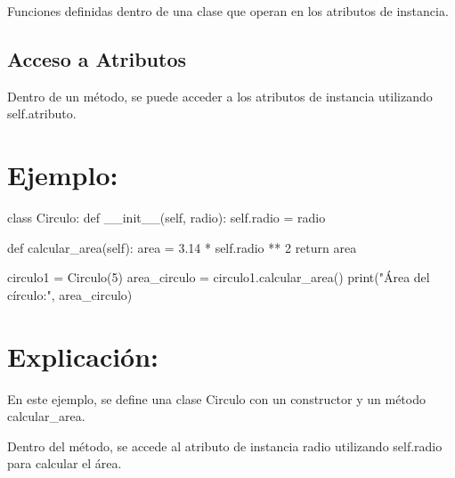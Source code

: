\documentclass[
  a4paper,
  DIV=11,
  numbers=noendperiod,
  onepage,
  openany]{scrreprt}
\newenvironment{Shaded}{\begin{snugshade}}{\end{snugshade}}
\newcommand{\BuiltInTok}[1]{\textcolor[rgb]{0.00,0.23,0.31}{#1}}
\newcommand{\ControlFlowTok}[1]{\textcolor[rgb]{0.00,0.23,0.31}{#1}}
\newcommand{\DecValTok}[1]{\textcolor[rgb]{0.68,0.00,0.00}{#1}}
\newcommand{\FloatTok}[1]{\textcolor[rgb]{0.68,0.00,0.00}{#1}}
\newcommand{\FunctionTok}[1]{\textcolor[rgb]{0.28,0.35,0.67}{#1}}
\newcommand{\KeywordTok}[1]{\textcolor[rgb]{0.00,0.23,0.31}{#1}}
\newcommand{\NormalTok}[1]{\textcolor[rgb]{0.00,0.23,0.31}{#1}}
\newcommand{\OperatorTok}[1]{\textcolor[rgb]{0.37,0.37,0.37}{#1}}
\newcommand{\StringTok}[1]{\textcolor[rgb]{0.13,0.47,0.30}{#1}}
\newcommand{\VariableTok}[1]{\textcolor[rgb]{0.07,0.07,0.07}{#1}}
\begin{document}
Funciones definidas dentro de una clase que operan en los atributos de
instancia.

\hypertarget{acceso-a-atributos}{%
\subsection{Acceso a Atributos}\label{acceso-a-atributos}}

Dentro de un método, se puede acceder a los atributos de instancia
utilizando self.atributo.

\hypertarget{ejemplo-52}{%
\section{Ejemplo:}\label{ejemplo-52}}

\begin{Shaded}
\begin{Highlighting}[]
\KeywordTok{class}\NormalTok{ Circulo:}
    \KeywordTok{def} \FunctionTok{\_\_init\_\_}\NormalTok{(}\VariableTok{self}\NormalTok{, radio):}
        \VariableTok{self}\NormalTok{.radio }\OperatorTok{=}\NormalTok{ radio}

    \KeywordTok{def}\NormalTok{ calcular\_area(}\VariableTok{self}\NormalTok{):}
\NormalTok{        area }\OperatorTok{=} \FloatTok{3.14} \OperatorTok{*} \VariableTok{self}\NormalTok{.radio }\OperatorTok{**} \DecValTok{2}
        \ControlFlowTok{return}\NormalTok{ area}

\NormalTok{circulo1 }\OperatorTok{=}\NormalTok{ Circulo(}\DecValTok{5}\NormalTok{)}
\NormalTok{area\_circulo }\OperatorTok{=}\NormalTok{ circulo1.calcular\_area()}
\BuiltInTok{print}\NormalTok{(}\StringTok{"Área del círculo:"}\NormalTok{, area\_circulo)}
\end{Highlighting}
\end{Shaded}

\hypertarget{explicaciuxf3n-52}{%
\section{Explicación:}\label{explicaciuxf3n-52}}

En este ejemplo, se define una clase Circulo con un constructor y un
método calcular\_area.

Dentro del método, se accede al atributo de instancia radio utilizando
self.radio para calcular el área.
\end{document}
